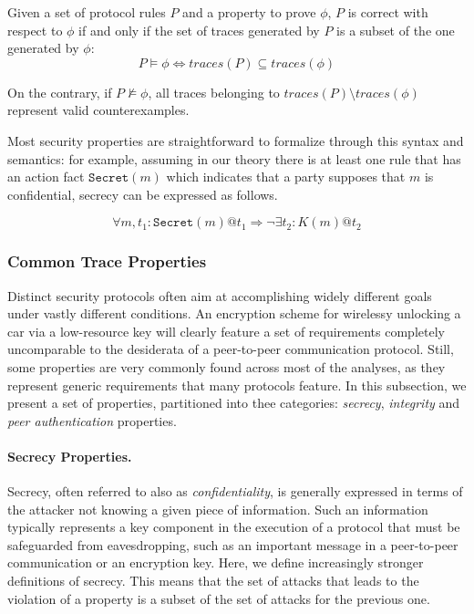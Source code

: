 \begin{definition}[Correctness]
    Given a set of protocol rules $P$ and a property to prove $\phi$, $P$ is correct with respect to $\phi$ if and only if the set of traces generated by $P$ is a subset of the one generated by $\phi$:
    \begin{equation*}
        P \vDash \phi \iff traces(P) \subseteq traces(\phi)
    \end{equation*}

    \noindent On the contrary, if $P \not \vDash \phi$, all traces belonging to $traces(P) \setminus traces(\phi)$ represent valid counterexamples.
\end{definition}

Most security properties are straightforward to formalize through this syntax and semantics: for example, assuming in our theory there is at least one rule that has an action fact $\texttt{Secret}(m)$ which indicates that a party supposes that $m$ is confidential, secrecy can be expressed as follows.

\begin{equation*}
    \forall m, t_1: \texttt{Secret}(m) @ t_1 \Rightarrow \neg \exists t_2 : K(m) @ t_2
\end{equation*}

\subsubsection{Common Trace Properties}
\label{sec:traceproperties}
Distinct security protocols often aim at accomplishing widely different goals under vastly different conditions. An encryption scheme for wirelessy unlocking a car via a low-resource key will clearly feature a set of requirements completely uncomparable to the desiderata of a peer-to-peer communication protocol. Still, some properties are very commonly found across most of the analyses, as they represent generic requirements that many protocols feature. In this subsection, we present a set of properties, partitioned into thee categories: \textit{secrecy}, \textit{integrity} and \textit{peer authentication} properties.

\paragraph{\textbf{Secrecy Properties}.} Secrecy, often referred to also as \textit{confidentiality}, is generally expressed in terms of the attacker not knowing a given piece of information. Such an information typically represents a key component in the execution of a protocol that must be safeguarded from eavesdropping, such as an important message in a peer-to-peer communication or an encryption key. Here, we define increasingly stronger definitions of secrecy. This means that the set of attacks that leads to the violation of a property is a subset of the set of attacks for the previous one.

